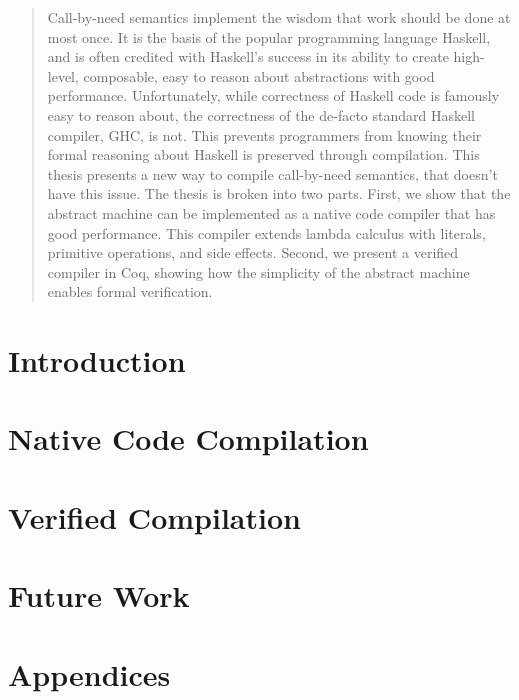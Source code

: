 \documentclass[botnum, fleqn]{unmeethesis}
\begin{document}
\begin{abstract}
Call-by-need semantics implement the wisdom that work should be done at most
once. It is the basis of the popular programming language Haskell, and is often
credited with Haskell's success in its ability to create high-level, composable,
easy to reason about abstractions with good performance. Unfortunately, while
correctness of Haskell code is famously easy to reason about, the correctness of
the de-facto standard Haskell compiler, GHC, is not. This prevents programmers
from knowing their formal reasoning about Haskell is preserved through
compilation. This thesis presents a new way to compile call-by-need semantics,
that doesn't have this issue. The thesis is broken into two parts. First, we
show that the abstract machine can be implemented as a native code compiler that
has good performance. This compiler extends lambda calculus with literals,
primitive operations, and side effects. Second, we present a verified compiler
in Coq, showing how the simplicity of the abstract machine enables formal
verification. 
\clearpage %
\end{abstract}

\tableofcontents
\listoffigures

\mainmatter

\chapter{Introduction}


\chapter{Native Code Compilation}











\chapter{Verified Compilation}










\chapter{Future Work}

\chapter*{Appendices}

\appendix





\end{document}
